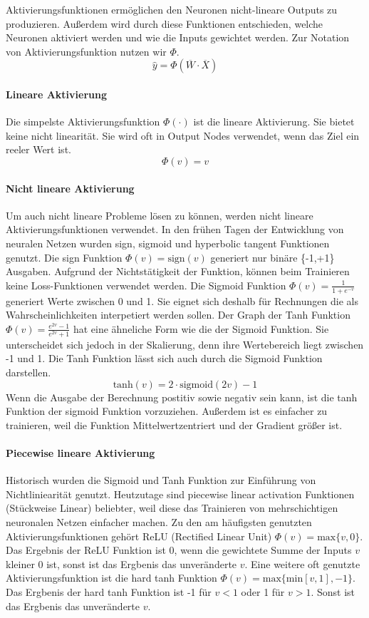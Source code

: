 Aktivierungsfunktionen ermöglichen den Neuronen nicht-lineare Outputs zu produzieren. Außerdem wird durch diese Funktionen entschieden, 
welche Neuronen aktiviert werden und wie die Inputs gewichtet werden. Zur Notation von Aktivierungsfunktion nutzen wir $\Phi$.
$$\hat{y} = \Phi(\overline{W} \cdot \overline{X})$$
\paragraph{Lineare Aktivierung}
Die simpelste Aktivierungsfunktion $\Phi(\cdot)$ ist die lineare Aktivierung. Sie bietet keine nicht linearität. Sie wird oft in Output Nodes
verwendet, wenn das Ziel ein reeler Wert ist.
$$\Phi(v) = v$$
\paragraph{Nicht lineare Aktivierung}
Um auch nicht lineare Probleme lösen zu können, werden nicht lineare Aktivierungsfunktionen verwendet. In den frühen Tagen der Entwicklung von neuralen Netzen wurden sign, sigmoid und hyperbolic tangent Funktionen genutzt.
Die sign Funktion $\Phi(v) = \text{sign}(v)$ generiert nur binäre \{-1,+1\} Ausgaben. Aufgrund der Nichtstätigkeit der Funktion, können beim Trainieren keine Loss-Funktionen verwendet werden.
Die Sigmoid Funktion $\Phi(v) = \frac{1}{1 + e^{-v}}$ generiert Werte zwischen 0 und 1. Sie eignet sich deshalb für Rechnungen die als Wahrscheinlichkeiten interpetiert werden sollen.
Der Graph der Tanh Funktion $\Phi(v) = \frac{e^{2v} - 1}{e^{2v} + 1}$ hat eine ähneliche Form wie die der Sigmoid Funktion. Sie unterscheidet sich jedoch in der Skalierung, denn ihre Wertebereich liegt zwischen -1 und 1.
Die Tanh Funktion lässt sich auch durch die Sigmoid Funktion darstellen.
$$\text{tanh}(v) = 2 \cdot \text{sigmoid}(2v) - 1$$
Wenn die Ausgabe der Berechnung postitiv sowie negativ sein kann, ist die tanh Funktion der sigmoid Funktion vorzuziehen. Außerdem ist es einfacher zu trainieren, weil die Funktion Mittelwertzentriert
und der Gradient größer ist.

\paragraph{Piecewise lineare Aktivierung}
Historisch wurden die Sigmoid und Tanh Funktion zur Einführung von Nichtliniearität genutzt. Heutzutage sind piecewise linear activation Funktionen (Stückweise Linear) beliebter, weil diese das Trainieren 
von mehrschichtigen neuronalen Netzen einfacher machen.
Zu den am häufigsten genutzten Aktivierungsfunktionen gehört ReLU (Rectified Linear Unit) $\Phi(v) = \text{max}\{v,0\}$. Das Ergebnis der ReLU Funktion ist 0, wenn die gewichtete Summe der Inputs $v$ kleiner 0 ist, sonst ist das Ergbenis das unveränderte $v$.
Eine weitere oft genutzte Aktivierungsfunktion ist die hard tanh Funktion $\Phi(v) = \text{max}\{\text{min}[v,1],-1\}$. Das Ergbenis der hard tanh Funktion ist -1 für $v < 1$ oder 1 für $v > 1$. Sonst ist das Ergbenis das unveränderte $v$. 


